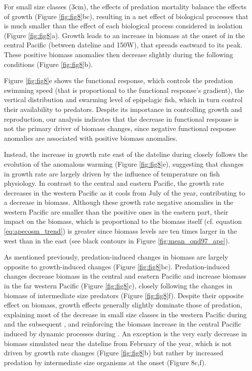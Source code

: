 For small size classes (3cm), the effects of predation mortality balance the effects of growth (Figure \ref{fig:fig8}bc), resulting in a net effect of biological processes that is much smaller than the effect of each biological process considered in isolation (Figure \ref{fig:fig8}a). Growth leads to an increase in biomass at the onset of \nino{} in the central Pacific (between dateline and 150\degree{}W), that spreads eastward to its peak. These positive biomass anomalies then decrease slightly during the following \nina{} conditions (Figure \ref{fig:fig8}b).

Figure \ref{fig:fig8}e shows the functional response, which controls the predation swimming speed (that is proportional to the functional response's gradient), the vertical distribution and swarming level of epipelagic fish, which in turn control their availability to predators.  Despite its importance in controlling growth and reproduction, our analysis indicates that the decrease in functional response is not the primary driver of biomass changes, since negative functional response anomalies are associated with positive biomass anomalies.

Instead, the increase in growth rate east of the dateline during \nino{} closely follows the evolution of the anomalous warming (Figure \ref{fig:fig8}e), suggesting that changes in growth rate are largely driven by the influence of temperature on fish physiology. In contrast to the central and eastern Pacific, the growth rate decreases in the western Pacific as it cools from July of the \nino{} year, contributing to a decrease in biomass. Although these growth rate negative anomalies in the western Pacific are smaller than the positive ones in the eastern part, their impact on the biomass, which is proportional to the biomass itself (cf. equation \ref{eq:apecosm_trend}) is greater since biomass levels are ten times larger in the west than in the east (see black contours in Figure \ref{fig:mean_ond97_ape}).

As mentioned previously, predation-induced changes in biomass are largely opposite to growth-induced changes  (Figure \ref{fig:fig8}bc). Predation-induced changes decrease biomass in the central and eastern Pacific and increase biomass in the far western Pacific (Figure \ref{fig:fig8}c), closely following the changes in biomass of intermediate size predators (Figure \ref{fig:fig8}f). Despite their opposite effect on biomass, growth effects generally slightly dominate those of predation, explaining most of the decrease in small size classes in the western Pacific during \nino{} and the subsequent \nina{}, and reinforcing the biomass increase in the central Pacific induced by dynamic processes during \nino{}. An exception is the very early decrease in biomass simulated near the dateline from February of the \nino{} year, which is not driven by growth rate changes (Figure \ref{fig:fig8}b) but rather by increased predation by intermediate size organisms at the \nino{} onset (Figure 8c,f).

